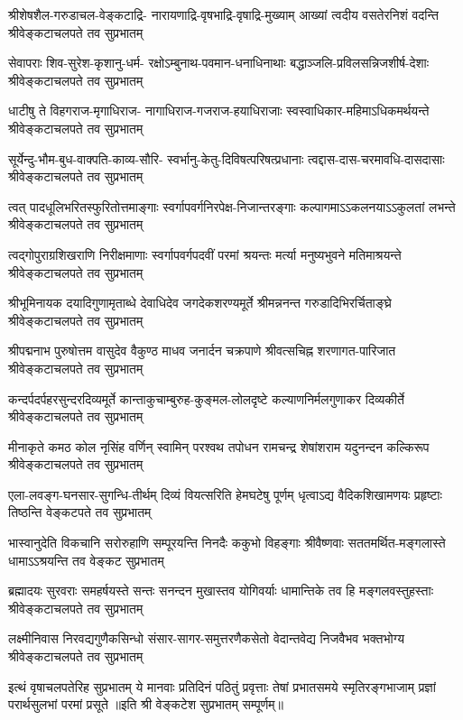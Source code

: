\fourlineindentedshloka
{श्रीशेषशैल-गरुडाचल-वेङ्कटाद्रि-}
{नारायणाद्रि-वृषभाद्रि-वृषाद्रि-मुख्याम्}
{आख्यां त्वदीय वसतेरनिशं वदन्ति}
{श्रीवेङ्कटाचलपते तव सुप्रभातम्}

\fourlineindentedshloka
{सेवापराः शिव-सुरेश-कृशानु-धर्म-}
{रक्षोऽम्बुनाथ-पवमान-धनाधिनाथाः}
{बद्धाञ्जलि-प्रविलसन्निजशीर्ष-देशाः}
{श्रीवेङ्कटाचलपते तव सुप्रभातम्}

\fourlineindentedshloka
{धाटीषु ते विहगराज-मृगाधिराज-}
{नागाधिराज-गजराज-हयाधिराजाः}
{स्वस्वाधिकार-महिमाऽधिकमर्थयन्ते}
{श्रीवेङ्कटाचलपते तव सुप्रभातम्}

\fourlineindentedshloka
{सूर्येन्दु-भौम-बुध-वाक्पति-काव्य-सौरि-}
{स्वर्भानु-केतु-दिविषत्परिषत्प्रधानाः}
{त्वद्दास-दास-चरमावधि-दासदासाः}
{श्रीवेङ्कटाचलपते तव सुप्रभातम्}

\fourlineindentedshloka
{त्वत् पादधूलिभरितस्फुरितोत्तमाङ्गाः}
{स्वर्गापवर्गनिरपेक्ष-निजान्तरङ्गाः}
{कल्पागमाऽऽकलनयाऽऽकुलतां लभन्ते}
{श्रीवेङ्कटाचलपते तव सुप्रभातम्}

\fourlineindentedshloka
{त्वद्गोपुराग्रशिखराणि निरीक्षमाणाः}
{स्वर्गापवर्गपदवीं परमां श्रयन्तः}
{मर्त्या मनुष्यभुवने मतिमाश्रयन्ते}
{श्रीवेङ्कटाचलपते तव सुप्रभातम्}

\fourlineindentedshloka
{श्रीभूमिनायक दयादिगुणामृताब्धे}
{देवाधिदेव जगदेकशरण्यमूर्ते}
{श्रीमन्ननन्त गरुडादिभिरर्चिताङ्घ्रे}
{श्रीवेङ्कटाचलपते तव सुप्रभातम्}

\fourlineindentedshloka
{श्रीपद्मनाभ पुरुषोत्तम वासुदेव}
{वैकुण्ठ माधव जनार्दन चक्रपाणे}
{श्रीवत्सचिह्न शरणागत-पारिजात}
{श्रीवेङ्कटाचलपते तव सुप्रभातम्}

\fourlineindentedshloka
{कन्दर्पदर्पहरसुन्दरदिव्यमूर्ते}
{कान्ताकुचाम्बुरुह-कुङ्मल-लोलदृष्टे}
{कल्याणनिर्मलगुणाकर दिव्यकीर्ते}
{श्रीवेङ्कटाचलपते तव सुप्रभातम्}

\fourlineindentedshloka
{मीनाकृते कमठ कोल नृसिंह वर्णिन्}
{स्वामिन् परश्वथ तपोधन रामचन्द्र}
{शेषांशराम यदुनन्दन कल्किरूप}
{श्रीवेङ्कटाचलपते तव सुप्रभातम्}

\fourlineindentedshloka
{एला-लवङ्ग-घनसार-सुगन्धि-तीर्थम्}
{दिव्यं वियत्सरिति हेमघटेषु पूर्णम्}
{धृत्वाऽद्य वैदिकशिखामणयः प्रहृष्टाः}
{तिष्ठन्ति वेङ्कटपते तव सुप्रभातम्}

\fourlineindentedshloka
{भास्वानुदेति विकचानि सरोरुहाणि}
{सम्पूरयन्ति निनदैः ककुभो विहङ्गाः}
{श्रीवैष्णवाः सततमर्थित-मङ्गलास्ते}
{धामाऽऽश्रयन्ति तव वेङ्कट सुप्रभातम्}

\fourlineindentedshloka
{ब्रह्मादयः सुरवराः समहर्षयस्ते}
{सन्तः सनन्दन मुखास्तव योगिवर्याः}
{धामान्तिके तव हि मङ्गलवस्तुहस्ताः}
{श्रीवेङ्कटाचलपते तव सुप्रभातम्}

\fourlineindentedshloka
{लक्ष्मीनिवास निरवद्यगुणैकसिन्धो}
{संसार-सागर-समुत्तरणैकसेतो}
{वेदान्तवेद्य निजवैभव भक्तभोग्य}
{श्रीवेङ्कटाचलपते तव सुप्रभातम्}

\fourlineindentedshloka
{इत्थं वृषाचलपतेरिह सुप्रभातम्}
{ये मानवाः प्रतिदिनं पठितुं प्रवृत्ताः}
{तेषां प्रभातसमये स्मृतिरङ्गभाजाम्}
{प्रज्ञां परार्थसुलभां परमां प्रसूते}
॥इति श्री वेङ्कटेश सुप्रभातम् सम्पूर्णम्॥